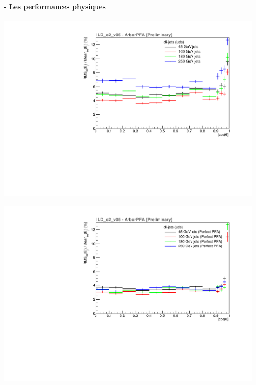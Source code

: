 \documentclass[8pt]{beamer}
\begin{document}
\begin{frame}
\begin{minipage}{0.49\linewidth}
\begin{center}
      \end{center}
    \end{minipage}
  \end{frame}

  \begin{frame}
  \frametitle{\secname}
  \framesubtitle{\subsecname - Les performances physiques}
    \begin{minipage}{0.49\linewidth}
      \begin{center}
        \includegraphics[width=\linewidth]{ILDArborPFA_Resolution_NoNeutralHadron.pdf}
      \end{center}
    \end{minipage}
    \begin{minipage}{0.49\linewidth}
      \begin{center}
        \includegraphics[width=\linewidth]{ILDArborPFA_PerfectResolution_NoNeutralHadron.pdf}
      \end{center}
    \end{minipage}
  \end{frame}
\end{document}
